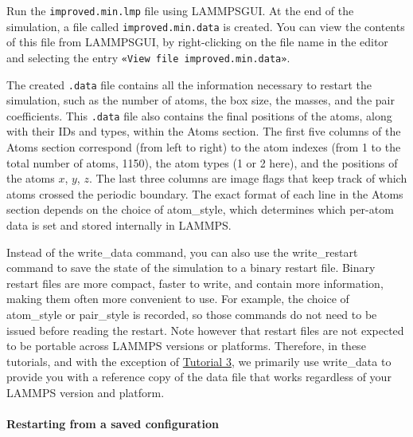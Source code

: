 \documentclass[9pt,tutorial]{livecoms}
\newcommand{\lmpcmd}[1]{\hspace{0pt}\colorbox{listing}{\textcolor{command}{\small{#1}}}\hspace{0pt}} %
\newcommand{\lmpcmdnote}[1]{\hspace{0pt}\colorbox{note_listing}{\textcolor{command}{\small{#1}}}\hspace{0pt}} %
\newcommand{\flecmd}[1]{\textcolor{command}{\texttt{#1}}} %
\newcommand{\guicmd}[1]{\textcolor{command}{\texttt{«#1»}}} %
\newcommand{\lammpsgui}{\textsf{LAMMPS\textendash GUI}}
\begin{document}
Run the \flecmd{improved.min.lmp} file using \lammpsgui{}.  At the end
of the simulation, a file called \flecmd{improved.min.data} is created.
You can view the contents of this file from \lammpsgui{}, by
right-clicking on the file name in the editor and selecting the entry
\guicmd{View file improved.min.data}.

The created \flecmd{.data} file contains all the information necessary
to restart the simulation, such as the number of atoms, the box size,
the masses, and the pair coefficients.   {\color{blue}This \flecmd{.data} file also
contains the final positions of the atoms, along with their IDs and types,
within the \lmpcmd{Atoms} section.}  The first five columns of the \lmpcmd{Atoms} section
correspond (from left to right) to the atom indexes (from 1 to the total
number of atoms, 1150), the atom types (1 or 2 here), and the positions
of the atoms $x$, $y$, $z$.  The last three columns are image flags that
keep track of which atoms crossed the periodic boundary.  The exact
format of each line in the \lmpcmd{Atoms} section depends on the choice
of \lmpcmd{atom\_style}, which determines which per-atom data is set and
stored internally in LAMMPS.

\begin{note}
Instead of the \lmpcmdnote{write\_data} command, you can also use the
\lmpcmdnote{write\_restart} command to save the state
of the simulation to a binary restart file.  Binary restart files are
more compact, faster to write, and contain more information, making them often
more convenient to use.  For example, the choice of \lmpcmdnote{atom\_style}
or \lmpcmdnote{pair\_style} is recorded, so those commands do not need to be issued
before reading the restart.  Note however that restart files are not expected to be
portable across LAMMPS versions or platforms.  Therefore, in these tutorials,
and with the exception of \hyperref[all-atom-label]{Tutorial 3}, we primarily use \lmpcmdnote{write\_data} to provide you with a reference
copy of the data file that works regardless of your LAMMPS version and platform.
\end{note}

\paragraph{Restarting from a saved configuration}
\end{document}
